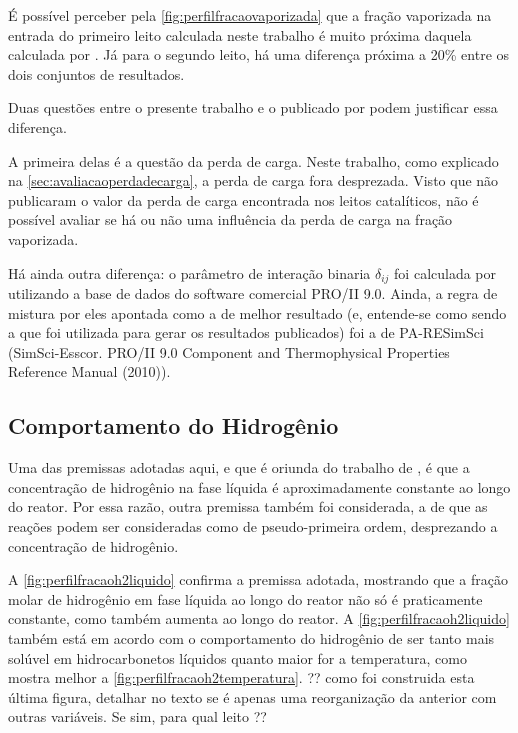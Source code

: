É possível perceber pela \autoref{fig:perfilfracaovaporizada} que a fração
vaporizada na entrada do primeiro leito calculada neste trabalho é muito próxima
daquela calculada por . Já para o segundo leito, há uma
diferença próxima a 20\% entre os dois conjuntos de resultados.

Duas questões entre o presente trabalho e o publicado por
 podem justificar essa diferença.

A primeira delas é a questão da perda de carga. Neste trabalho, como explicado
na \autoref{sec:avaliacaoperdadecarga}, a perda de carga fora desprezada. Visto
que  não publicaram o valor da perda de carga encontrada nos
leitos catalíticos, não é possível avaliar se há ou não uma influência da perda
de carga na fração vaporizada.

Há ainda outra diferença: o parâmetro de interação binaria $\delta_{ij}$ foi
calculada por  utilizando a base de dados do software
comercial PRO/II 9.0. Ainda, a regra de mistura por eles apontada como a de melhor resultado (e,
entende-se como sendo a que foi utilizada para gerar os resultados publicados)
foi a de PA-RESimSci (SimSci-Esscor. PRO/II 9.0 Component and Thermophysical
Properties Reference Manual (2010)).

\subsection{Comportamento do Hidrogênio} \label{comportamentodohidrogenio}

Uma das premissas adotadas aqui, e que é oriunda do trabalho de
, é que a concentração de hidrogênio na
fase líquida é aproximadamente constante ao longo do reator. Por essa razão,
outra premissa também foi considerada, a de que as reações podem ser
consideradas como de pseudo-primeira ordem, desprezando a concentração de
hidrogênio.

A \autoref{fig:perfilfracaoh2liquido} confirma a premissa adotada, mostrando que
a fração molar de hidrogênio em fase líquida ao longo do reator não só é
praticamente constante, como também aumenta ao longo do reator. A
\autoref{fig:perfilfracaoh2liquido} também está em acordo com o
comportamento do hidrogênio de ser tanto mais solúvel em hidrocarbonetos
líquidos quanto maior for a temperatura, como mostra melhor a
\autoref{fig:perfilfracaoh2temperatura}.
?? como foi construida esta última figura, detalhar no texto se é apenas
uma reorganização da anterior com outras variáveis. Se sim, para qual leito ??


